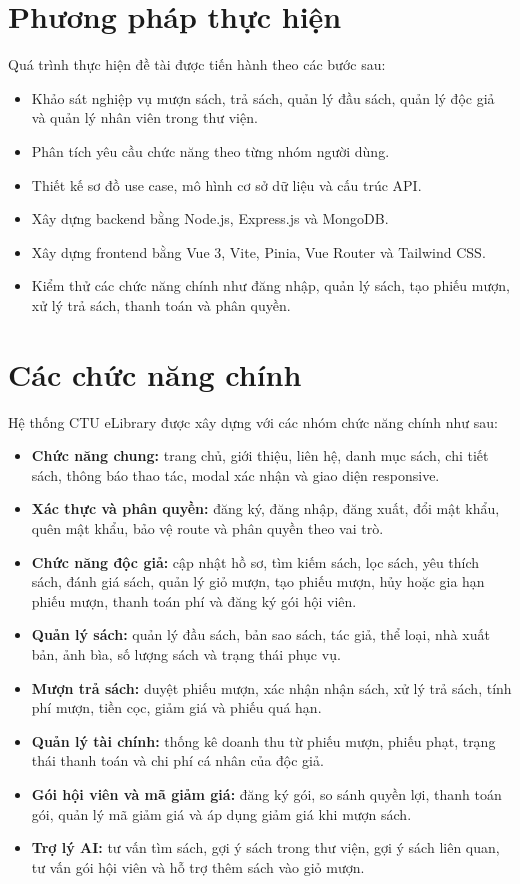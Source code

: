 \documentclass[../main.tex]{subfiles}
\begin{document}
\section{Phương pháp thực hiện}

Quá trình thực hiện đề tài được tiến hành theo các bước sau:

\begin{itemize}
    \item Khảo sát nghiệp vụ mượn sách, trả sách, quản lý đầu sách, quản lý độc giả và quản lý nhân viên trong thư viện.
    \item Phân tích yêu cầu chức năng theo từng nhóm người dùng.
    \item Thiết kế sơ đồ use case, mô hình cơ sở dữ liệu và cấu trúc API.
    \item Xây dựng backend bằng Node.js, Express.js và MongoDB.
    \item Xây dựng frontend bằng Vue 3, Vite, Pinia, Vue Router và Tailwind CSS.
    \item Kiểm thử các chức năng chính như đăng nhập, quản lý sách, tạo phiếu mượn, xử lý trả sách, thanh toán và phân quyền.
\end{itemize}

\section{Các chức năng chính}

Hệ thống CTU eLibrary được xây dựng với các nhóm chức năng chính như sau:

\begin{itemize}
    \item \textbf{Chức năng chung:} trang chủ, giới thiệu, liên hệ, danh mục sách, chi tiết sách, thông báo thao tác, modal xác nhận và giao diện responsive.
    \item \textbf{Xác thực và phân quyền:} đăng ký, đăng nhập, đăng xuất, đổi mật khẩu, quên mật khẩu, bảo vệ route và phân quyền theo vai trò.
    \item \textbf{Chức năng độc giả:} cập nhật hồ sơ, tìm kiếm sách, lọc sách, yêu thích sách, đánh giá sách, quản lý giỏ mượn, tạo phiếu mượn, hủy hoặc gia hạn phiếu mượn, thanh toán phí và đăng ký gói hội viên.
    \item \textbf{Quản lý sách:} quản lý đầu sách, bản sao sách, tác giả, thể loại, nhà xuất bản, ảnh bìa, số lượng sách và trạng thái phục vụ.
    \item \textbf{Mượn trả sách:} duyệt phiếu mượn, xác nhận nhận sách, xử lý trả sách, tính phí mượn, tiền cọc, giảm giá và phiếu quá hạn.
    \item \textbf{Quản lý tài chính:} thống kê doanh thu từ phiếu mượn, phiếu phạt, trạng thái thanh toán và chi phí cá nhân của độc giả.
    \item \textbf{Gói hội viên và mã giảm giá:} đăng ký gói, so sánh quyền lợi, thanh toán gói, quản lý mã giảm giá và áp dụng giảm giá khi mượn sách.
    \item \textbf{Trợ lý AI:} tư vấn tìm sách, gợi ý sách trong thư viện, gợi ý sách liên quan, tư vấn gói hội viên và hỗ trợ thêm sách vào giỏ mượn.
\end{itemize}
\end{document}
